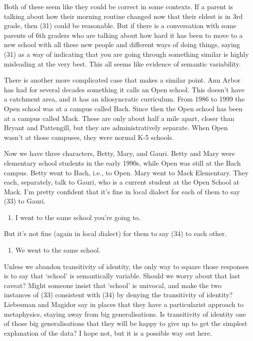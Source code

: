 \documentclass[
  11pt,
  letterpaper,
  DIV=11,
  numbers=noendperiod,
  twoside]{scrartcl}
\providecommand{\tightlist}{%
  \setlength{\itemsep}{0pt}\setlength{\parskip}{0pt}}
\begin{document}
Both of these seem like they could be correct in some contexts. If a
parent is talking about how their morning routine changed now that their
eldest is in 3rd grade, then (31) could be reasonable. But if there is a
conversation with some parents of 6th graders who are talking about how
hard it has been to move to a new school with all these new people and
different ways of doing things, saying (31) as a way of indicating that
you are going through something similar is highly misleading at the very
best. This all seems like evidence of semantic variability.

There is another more complicated case that makes a similar point. Ann
Arbor has had for several decades something it calls an Open school.
This doesn't have a catchment area, and it has an idiosyncratic
curriculum. From 1986 to 1999 the Open school was at a campus called
Bach. Since then the Open school has been at a campus called Mack. These
are only about half a mile apart, closer than Bryant and Pattengill, but
they are administratively separate. When Open wasn't at those campuses,
they were normal K-5 schools.

Now we have three characters, Betty, Mary, and Gauri. Betty and Mary
were elementary school students in the early 1990s, while Open was still
at the Bach campus. Betty went to Bach, i.e., to Open. Mary went to Mack
Elementary. They each, separately, talk to Gauri, who is a current
student at the Open School at Mack. I'm pretty confident that it's fine
in local dialect for each of them to say (33) to Gauri.

\begin{enumerate}
\def\labelenumi{(\arabic{enumi})}
\setcounter{enumi}{32}
\tightlist
\item
  I went to the same school you're going to.
\end{enumerate}

But it's not fine (again in local dialect) for them to say (34) to each
other.

\begin{enumerate}
\def\labelenumi{(\arabic{enumi})}
\setcounter{enumi}{33}
\tightlist
\item
  We went to the same school.
\end{enumerate}

Unless we abandon transitivity of identity, the only way to square those
responses is to say that `school' is semantically variable. Should we
worry about that last caveat? Might someone insist that `school' is
univocal, and make the two instances of (33) consistent with (34) by
denying the transitivity of identity? Liebesman and Magidor say in
places that they have a particularist approach to metaphysics, staying
away from big generalisations. Is transitivity of identity one of those
big generalisations that they will be happy to give up to get the
simplest explanation of the data? I hope not, but it is a possible way
out here.
\end{document}
